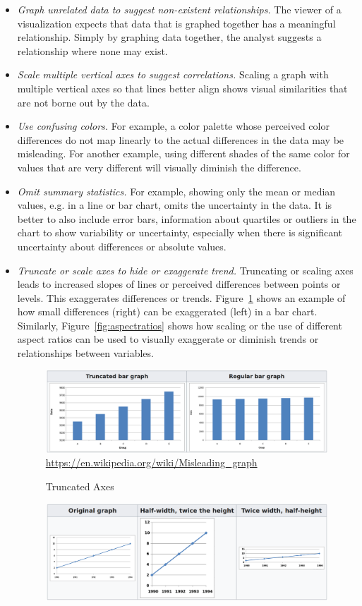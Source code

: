 \begin{itemize}
	\item \emph{Graph unrelated data to suggest non-existent relationships.} The viewer of a visualization expects that data that is graphed together has a meaningful relationship. Simply by graphing data together, the analyst suggests a relationship where none may exist.
	\item \emph{Scale multiple vertical axes to suggest correlations.} Scaling a graph with multiple vertical axes so that lines better align shows visual similarities that are not borne out by the data.
	\item \emph{Use confusing colors.} For example, a color palette whose perceived color differences do not map linearly to the actual differences in the data may be misleading. For another example, using different shades of the same color for values that are very different will visually diminish the difference.
	\item \emph{Omit summary statistics.} For example, showing only the mean or median values, e.g. in a line or bar chart, omits the uncertainty in the data. It is better to also include error bars, information about quartiles or outliers in the chart to show variability or uncertainty, especially when there is significant uncertainty about differences or absolute values.
	\item \emph{Truncate or scale axes to hide or exaggerate trend.} Truncating or scaling axes leads to increased slopes of lines or perceived differences between points or levels. This exaggerates differences or trends. Figure~\ref{fig:truncated} shows an example of how small differences (right) can be exaggerated (left) in a bar chart. Similarly, Figure~\ref{fig:aspectratios} shows how scaling or the use of different aspect ratios can be used to visually exaggerate or diminish trends or relationships between variables.
\begin{figure}
\centering
\includegraphics[width=.85\textwidth]{screen3.png} \\

\scriptsize\url{https://en.wikipedia.org/wiki/Misleading_graph}
\caption{Truncated Axes}
\label{fig:truncated}
\end{figure}
\begin{figure}
\centering
\includegraphics[width=\textwidth]{screen4.png}


\end{figure}
\end{itemize}
